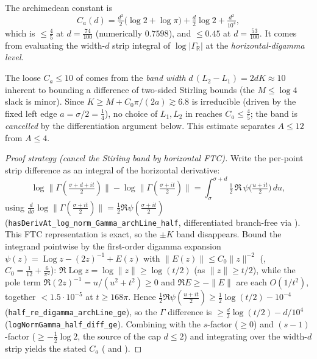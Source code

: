 \begin{lemma}
\label{lem:ls_Ca}
\leanok
The archimedean constant is
\[
  C_a(d)=\tfrac{d^2}{2}\bigl(\log 2+\log\pi\bigr)+\tfrac d2\log 2+\tfrac{d^2}{10^4},
\]
which is $\le\tfrac45$ at $d=\tfrac{74}{100}$ (numerically $0.7598$), and $\le0.45$ at
$d=\tfrac{53}{100}$. It comes from evaluating the width-$d$ strip integral of
$\log|\Gamma_{\mathbb R}|$ at the \emph{horizontal-digamma level}.

The loose $C_a\le10$ of  comes from the \emph{band width}
$d\,(L_2-L_1)=2dK\approx10$ inherent to bounding a difference of two-sided Stirling
bounds (the $M\le\log4$ slack is minor). Since $K\ge M+C_0\pi/(2a)\gtrsim6.8$ is
irreducible (driven by the fixed left edge $a=\sigma/2=\tfrac14$), no choice of
$L_1,L_2$ in  reaches $C_a\le\tfrac45$;
the band is \emph{cancelled} by the differentiation argument below. This estimate
separates $A\le12$ from $A\le4$.
\end{lemma}

\begin{proof}[Proof strategy (cancel the Stirling band by horizontal FTC)]
\leanok
Write the per-point strip difference as an integral of the horizontal derivative:
\[
  \log\bigl\|\Gamma(\tfrac{\sigma+d+it}2)\bigr\|-\log\bigl\|\Gamma(\tfrac{\sigma+it}2)\bigr\|
  =\int_\sigma^{\sigma+d}\tfrac12\,\Re\,\psi\!\bigl(\tfrac{u+it}2\bigr)\,du,
\]
using $\tfrac{d}{d\sigma}\log\|\Gamma(\tfrac{\sigma+it}2)\|=\tfrac12\Re\psi(\tfrac{\sigma+it}2)$
(\texttt{hasDerivAt\_log\_norm\_Gamma\_archLine\_half}, differentiated branch-free via
). This FTC representation is exact, so the
$\pm K$ band disappears. Bound the integrand pointwise by the first-order digamma expansion
$\psi(z)=\operatorname{Log}z-(2z)^{-1}+E(z)$ with $\|E(z)\|\le C_0\|z\|^{-2}$
(, $C_0=\tfrac1{12}+\tfrac{6}{\pi^2}$):
$\Re\operatorname{Log}z=\log\|z\|\ge\log(t/2)$ (as $\|z\|\ge t/2$), while the pole term
$\Re(2z)^{-1}=u/(u^2+t^2)\ge0$ and $\Re E\ge-\|E\|$ are each $O(1/t^2)$, together
$<1.5\cdot10^{-5}$ at $t\ge168\pi$. Hence
$\tfrac12\Re\psi(\tfrac{u+it}2)\ge\tfrac12\log(t/2)-10^{-4}$
(\texttt{half\_re\_digamma\_archLine\_ge}), so the $\Gamma$ difference is
$\ge\tfrac d2\log(t/2)-d/10^4$ (\texttt{logNormGamma\_half\_diff\_ge}). Combining with
the $s$-factor ($\ge0$) and $(s-1)$-factor ($\ge-\tfrac12\log2$, the source of the cap $d\le2$) and
integrating over the width-$d$ strip yields the stated $C_a$
( and
).
\end{proof}

